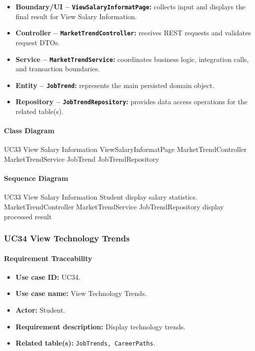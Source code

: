 \begin{itemize}
    \item \textbf{Boundary/UI -- \texttt{ViewSalaryInformatPage}:} collects input and displays the final result for View Salary Information.
    \item \textbf{Controller -- \texttt{MarketTrendController}:} receives REST requests and validates request DTOs.
    \item \textbf{Service -- \texttt{MarketTrendService}:} coordinates business logic, integration calls, and transaction boundaries.
    \item \textbf{Entity -- \texttt{JobTrend}:} represents the main persisted domain object.
    \item \textbf{Repository -- \texttt{JobTrendRepository}:} provides data access operations for the related table(s).
\end{itemize}

\paragraph{Class Diagram}

\ClassDiagram
{UC33 View Salary Information}
{ViewSalaryInformatPage}
{MarketTrendController}
{MarketTrendService}
{JobTrend}
{JobTrendRepository}

\paragraph{Sequence Diagram}

\SequenceDiagram
{UC33 View Salary Information}
{Student}
{display salary statistics.}
{MarketTrendController}
{MarketTrendService}
{JobTrendRepository}
{display processed result}

\subsubsection{UC34 View Technology Trends}

\paragraph{Requirement Traceability}

\begin{itemize}
    \item \textbf{Use case ID:} UC34.
    \item \textbf{Use case name:} View Technology Trends.
    \item \textbf{Actor:} Student.
    \item \textbf{Requirement description:} Display technology trends.
    \item \textbf{Related table(s):} \texttt{JobTrends, CareerPaths}.
\end{itemize}

